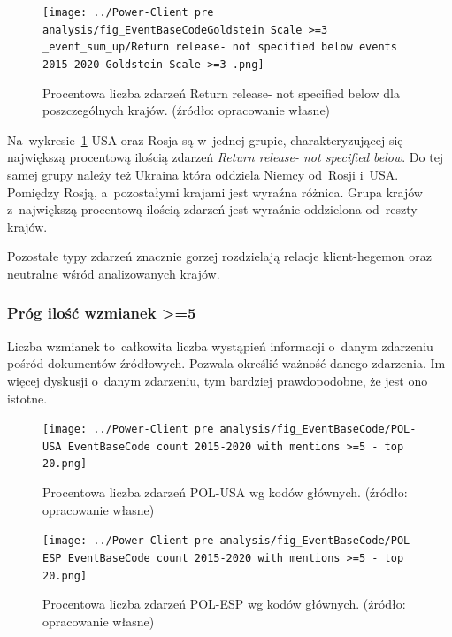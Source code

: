 \documentclass[11pt]{report}
\begin{document}
    \begin{figure}[tp]
        \centering
        \texttt{[image: ../Power-Client pre analysis/fig\_EventBaseCodeGoldstein Scale >=3 \_event\_sum\_up/Return release- not specified below events 2015-2020 Goldstein Scale >=3 .png]}
        \caption{Procentowa liczba zdarzeń Return release- not specified below dla poszczególnych krajów. (źródło: opracowanie własne)}
        \label{fig:Power-Client:ERC:Goldstein:SumUp:Return release- not specified below}
    \end{figure}

    Na~wykresie~\ref{fig:Power-Client:ERC:Goldstein:SumUp:Return release- not specified below} USA oraz Rosja są w~jednej grupie,
    charakteryzującej się największą procentową ilością zdarzeń \textit{Return release- not specified below}.
    Do tej samej grupy należy też Ukraina która oddziela Niemcy od~Rosji i~USA\@.
    Pomiędzy Rosją, a~pozostałymi krajami jest wyraźna różnica.
    Grupa krajów z~największą procentową ilością zdarzeń jest wyraźnie oddzielona od~reszty krajów.

    Pozostałe typy zdarzeń znacznie gorzej rozdzielają relacje klient-hegemon oraz neutralne wśród analizowanych krajów.

    \subsubsection{Próg ilość wzmianek >=5}
    Liczba wzmianek to~całkowita liczba wystąpień informacji o~danym zdarzeniu pośród dokumentów źródłowych.
    Pozwala określić ważność danego zdarzenia.
    Im więcej dyskusji o~danym zdarzeniu, tym bardziej prawdopodobne, że jest ono istotne.

    \begin{figure}[tp]
        \centering
        \texttt{[image: ../Power-Client pre analysis/fig\_EventBaseCode/POL-USA EventBaseCode count 2015-2020 with mentions >=5 - top 20.png]}
        \caption{Procentowa liczba zdarzeń POL-USA wg kodów głównych. (źródło: opracowanie własne)}
        \label{fig:Power-Client:EBC:Mentions:POL-USA}
    \end{figure}

    \begin{figure}[tp]
        \centering
        \texttt{[image: ../Power-Client pre analysis/fig\_EventBaseCode/POL-ESP EventBaseCode count 2015-2020 with mentions >=5 - top 20.png]}
        \caption{Procentowa liczba zdarzeń POL-ESP wg kodów głównych. (źródło: opracowanie własne)}
        \label{fig:Power-Client:EBC:Mentions:POL-ESP}
    \end{figure}
\end{document}

